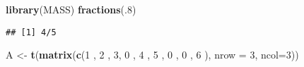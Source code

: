\documentclass[]{article}
\newenvironment{Shaded}{\begin{snugshade}}{\end{snugshade}}
\newcommand{\KeywordTok}[1]{\textcolor[rgb]{0.13,0.29,0.53}{\textbf{{#1}}}}
\newcommand{\DataTypeTok}[1]{\textcolor[rgb]{0.13,0.29,0.53}{{#1}}}
\newcommand{\DecValTok}[1]{\textcolor[rgb]{0.00,0.00,0.81}{{#1}}}
\newcommand{\StringTok}[1]{\textcolor[rgb]{0.31,0.60,0.02}{{#1}}}
\newcommand{\NormalTok}[1]{{#1}}
\begin{document}
\begin{Shaded}
\begin{Highlighting}[]
\KeywordTok{library}\NormalTok{(MASS)}
\KeywordTok{fractions}\NormalTok{(.}\DecValTok{8}\NormalTok{)}
\end{Highlighting}
\end{Shaded}

\begin{verbatim}
## [1] 4/5
\end{verbatim}

\begin{Shaded}
\begin{Highlighting}[]
\NormalTok{A <-}\StringTok{  }\KeywordTok{t}\NormalTok{(}\KeywordTok{matrix}\NormalTok{(}\KeywordTok{c}\NormalTok{(}\DecValTok{1} \NormalTok{, }\DecValTok{2} \NormalTok{, }\DecValTok{3}\NormalTok{,  }\DecValTok{0} \NormalTok{, }\DecValTok{4} \NormalTok{, }\DecValTok{5} \NormalTok{, }\DecValTok{0} \NormalTok{, }\DecValTok{0} \NormalTok{, }\DecValTok{6} \NormalTok{), }\DataTypeTok{nrow =} \DecValTok{3}\NormalTok{, }\DataTypeTok{ncol=}\DecValTok{3}\NormalTok{))}
\end{Highlighting}
\end{Shaded}
\end{document}
